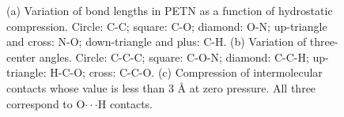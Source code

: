 \documentclass[prb,aps,nobibnotes,superbib,preprint]{revtex4}
\begin{document}
\begin{figure}
\caption{(a) Variation of bond lengths in PETN as a function of hydrostatic 
compression.  Circle: C-C; square: C-O; diamond: O-N; up-triangle and
cross: N-O; down-triangle and plus: C-H.  (b) Variation of
three-center angles. Circle: C-C-C; square: C-O-N; diamond: C-C-H;
up-triangle: H-C-O; cross: C-C-O. (c) Compression of intermolecular
contacts whose value is less than 3 \AA\/ at zero pressure.  All three
correspond to O$\cdot\cdot\cdot$H contacts.}
\label{fig:intramolecular}
\end{figure}
\end{document}
